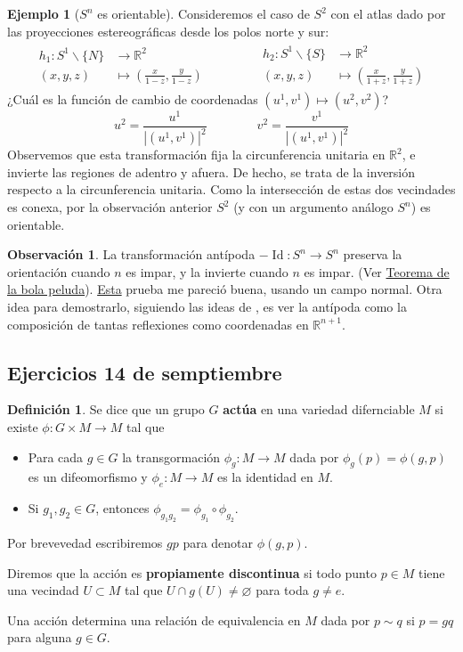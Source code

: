 \documentclass[spanish]{book}
\theoremstyle{definition}
\newtheorem*{defn}{Definición}
\newtheorem*{obs}{Observación}
\newtheorem*{ejem}{Ejemplo}
\newcommand{\R}{\mathbb{R}}
\DeclareMathOperator{\Id}{Id}
\begin{document}
	\begin{ejem}[$S^n$ es orientable]
		Consideremos el caso de $S^2$ con el atlas dado por las proyecciones estereográficas desde los polos norte y sur:
		\begin{align*}
			\begin{aligned}
				h_1:S^1\backslash\{N\}&\to\R^2\\
				(x,y,z)&\mapsto\left(\frac{x}{1-z},\frac{y}{1-z}\right)
			\end{aligned}\qquad\qquad
			\begin{aligned}
				h_2:S^1\backslash\{S\}&\to\R^2\\
				(x,y,z)&\mapsto\left(\frac{x}{1+z},\frac{y}{1+z}\right)
			\end{aligned}
		\end{align*}
		¿Cuál es la función de cambio de coordenadas $(u^1,v^1)\mapsto(u^2,v^2)$?
		\[u^2=\frac{u^1}{|(u^1,v^1)|^2}\qquad\qquad v^2=\frac{v^1}{|(u^1,v^1)|^2}\]
		Observemos que esta transformación fija la circunferencia unitaria en $\R^2$, e invierte las regiones de adentro y afuera. De hecho, se trata de la inversión respecto a la circunferencia unitaria. Como la intersección de estas dos vecindades es conexa, por la observación anterior $S^2$ (y con un argumento análogo $S^n$) es orientable.
	\end{ejem}
	\begin{obs}\label{obs:antipoda-orientacion}
		La transformación antípoda $-\Id:S^n\to S^n$ preserva la orientación cuando $n$ es impar, y la invierte cuando $n$ es impar. (Ver \hyperref[teo:bola-peluda]{Teorema de la bola peluda}). \href{https://math.stackexchange.com/questions/74712/proving-rigorously-a-map-preserves-orientation}{Esta} prueba me pareció buena, usando un campo normal. Otra idea para demostrarlo, siguiendo las ideas de \cite{Hatcher}, es ver la antípoda como la composición de tantas reflexiones como coordenadas en $\R^{n+1}$.
	\end{obs}
	\subsection{Ejercicios 14 de semptiembre}
	\begin{defn}
		Se dice que un grupo $G$ \textbf{actúa} en una variedad difernciable $M$ si existe $\phi:G\times M\to M$ tal que
		\begin{itemize}
			\item Para cada $g\in G$ la transgormación $\phi_g:M\to M$ dada por $\phi_g(p)=\phi(g,p)$ es un difeomorfismo y $\phi_e:M\to M$ es la identidad en $M$.
			\item Si $g_1,g_2\in G$, entonces $\phi_{g_1g_2}=\phi_{g_1}\circ\phi_{g_2}$.
		\end{itemize}
		Por brevevedad escribiremos $gp$ para denotar $\phi(g,p)$.
		
		Diremos que la acción es \textbf{propiamente discontinua} si todo punto $p\in M$ tiene una vecindad $U\subset M$ tal que $U\cap g(U)\neq\varnothing$ para toda $g\neq e$.
	\end{defn}
	Una acción determina una relación de equivalencia en $M$ dada por $p\sim q$ si $p=gq$ para alguna $g\in G$.
	
\end{document}
